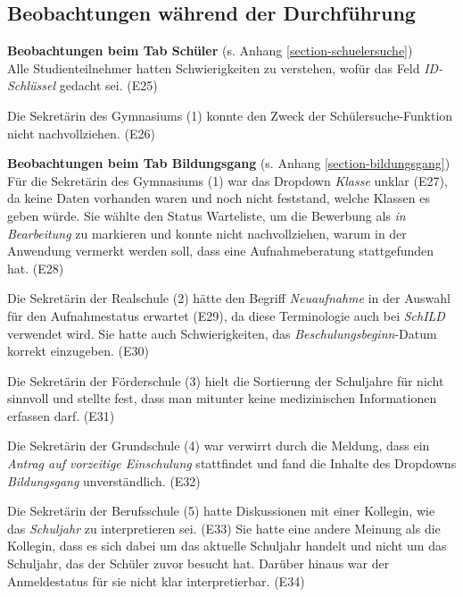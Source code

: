 \subsection{Beobachtungen während der Durchführung}

\textbf{Beobachtungen beim Tab \glqq Schüler\grqq{}}  (s. Anhang \ref{section-schuelersuche})\\  
Alle Studienteilnehmer hatten Schwierigkeiten zu verstehen, wofür das Feld \textit{ID-Schlüssel} gedacht sei. (E25)

Die Sekretärin des Gymnasiums (1) konnte den Zweck der Schülersuche-Funktion nicht nachvollziehen. (E26)


\textbf{Beobachtungen beim Tab \glqq Bildungsgang\grqq{}} (s. Anhang \ref{section-bildungsgang})\\
Für die Sekretärin des Gymnasiums (1) war das Dropdown \textit{Klasse} unklar (E27), da keine Daten vorhanden waren und noch nicht feststand, welche Klassen es geben würde. Sie wählte den Status \glqq Warteliste\grqq{}, um die Bewerbung als \textit{in Bearbeitung} zu markieren und konnte nicht nachvollziehen, warum in der Anwendung vermerkt werden soll, dass eine Aufnahmeberatung stattgefunden hat. (E28)

Die Sekretärin der Realschule (2) hätte den Begriff \textit{Neuaufnahme} in der Auswahl für den Aufnahmestatus erwartet (E29), da diese Terminologie auch bei \textit{SchILD} verwendet wird. Sie hatte auch Schwierigkeiten, das \textit{Beschulungsbeginn}-Datum korrekt einzugeben. (E30)

Die Sekretärin der Förderschule (3) hielt die Sortierung der Schuljahre für nicht sinnvoll und stellte fest, dass man mitunter keine medizinischen Informationen erfassen darf. (E31)

Die Sekretärin der Grundschule (4) war verwirrt durch die Meldung, dass ein \textit{Antrag auf vorzeitige Einschulung} stattfindet und fand die Inhalte des Dropdowns \textit{Bildungsgang} unverständlich. (E32)

Die Sekretärin der Berufsschule (5) hatte Diskussionen mit einer Kollegin, wie das \textit{Schuljahr} zu interpretieren sei. (E33) Sie hatte eine andere Meinung als die Kollegin, dass es sich dabei um das aktuelle Schuljahr handelt und nicht um das Schuljahr, das der Schüler zuvor besucht hat. Darüber hinaus war der Anmeldestatus für sie nicht klar interpretierbar. (E34)


